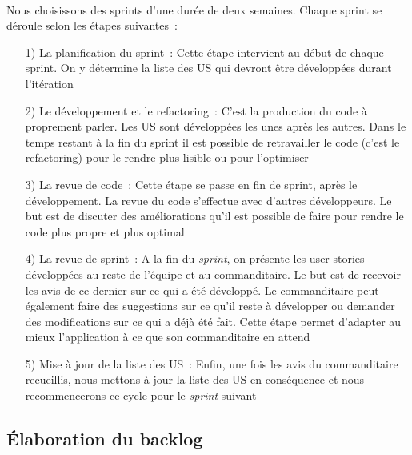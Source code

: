			\paragraph{}%
			Nous choisissons des sprints d'une durée de deux semaines. Chaque sprint se
			déroule selon les étapes suivantes~:
			\begin{itemize}
			  \item[1) La planification du sprint~:] Cette étape intervient au début de
			  chaque sprint. On y détermine la liste des US qui devront être
			  développées durant l'itération
			  \item[2) Le développement et le refactoring~:] C'est la production du code
			  à proprement parler. Les US sont développées les unes après les
			  autres. Dans le temps restant à la fin du sprint il est possible de
			  retravailler le code (c'est le refactoring) pour le rendre plus lisible ou
			  pour l'optimiser
			  \item[3) La revue de code~:] Cette étape se passe en fin de sprint, après
			  le développement. La revue du code s'effectue avec d'autres développeurs.
			  Le but est de discuter des améliorations qu'il est possible de faire pour
			  rendre le code plus propre et plus optimal
			  \item[4) La revue de sprint~:] A la fin du \textit{sprint}, on présente les
			  user stories développées au reste de l'équipe et au commanditaire. Le but est de
			  recevoir les avis de ce dernier sur ce qui a été développé. Le
			  commanditaire peut également faire des suggestions sur ce qu'il reste à
			  développer ou demander des modifications sur ce qui a déjà été fait. Cette
			  étape permet d'adapter au mieux l'application à ce que son commanditaire en
			  attend
			  \item[5) Mise à jour de la liste des US~:] Enfin, une fois les
			  avis du commanditaire recueillis, nous mettons à jour la liste des US en
			  conséquence et nous recommencerons ce cycle pour le \textit{sprint} suivant
			\end{itemize}
		
		\subsection{Élaboration du backlog}
